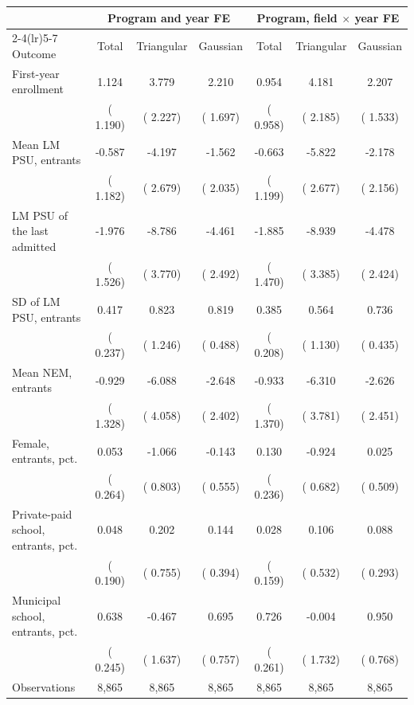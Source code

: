 \begin{tabular}{lcccccc}
\toprule
 & \multicolumn{3}{c}{Program and year FE} & \multicolumn{3}{c}{Program, field \(\times\) year FE} \\
\cmidrule(lr){2-4}\cmidrule(lr){5-7}
Outcome & Total & Triangular & Gaussian & Total & Triangular & Gaussian \\
\midrule
First-year enrollment &   1.124 &   3.779\sym{*} &   2.210 &   0.954 &   4.181\sym{*} &   2.207 \\
 & ( 1.190) & ( 2.227) & ( 1.697) & ( 0.958) & ( 2.185) & ( 1.533) \\
\addlinespace
Mean LM PSU, entrants &  -0.587 &  -4.197 &  -1.562 &  -0.663 &  -5.822\sym{**} &  -2.178 \\
 & ( 1.182) & ( 2.679) & ( 2.035) & ( 1.199) & ( 2.677) & ( 2.156) \\
LM PSU of the last admitted &  -1.976 &  -8.786\sym{**} &  -4.461\sym{*} &  -1.885 &  -8.939\sym{***} &  -4.478\sym{*} \\
 & ( 1.526) & ( 3.770) & ( 2.492) & ( 1.470) & ( 3.385) & ( 2.424) \\
SD of LM PSU, entrants &   0.417\sym{*} &   0.823 &   0.819\sym{*} &   0.385\sym{*} &   0.564 &   0.736\sym{*} \\
 & ( 0.237) & ( 1.246) & ( 0.488) & ( 0.208) & ( 1.130) & ( 0.435) \\
Mean NEM, entrants &  -0.929 &  -6.088 &  -2.648 &  -0.933 &  -6.310\sym{*} &  -2.626 \\
 & ( 1.328) & ( 4.058) & ( 2.402) & ( 1.370) & ( 3.781) & ( 2.451) \\
Female, entrants, pct. &   0.053 &  -1.066 &  -0.143 &   0.130 &  -0.924 &   0.025 \\
 & ( 0.264) & ( 0.803) & ( 0.555) & ( 0.236) & ( 0.682) & ( 0.509) \\
Private-paid school, entrants, pct. &   0.048 &   0.202 &   0.144 &   0.028 &   0.106 &   0.088 \\
 & ( 0.190) & ( 0.755) & ( 0.394) & ( 0.159) & ( 0.532) & ( 0.293) \\
Municipal school, entrants, pct. &   0.638\sym{**} &  -0.467 &   0.695 &   0.726\sym{***} &  -0.004 &   0.950 \\
 & ( 0.245) & ( 1.637) & ( 0.757) & ( 0.261) & ( 1.732) & ( 0.768) \\
\midrule
Observations &  8,865 &  8,865 &  8,865 &  8,865 &  8,865 &  8,865 \\
\bottomrule
\end{tabular}
